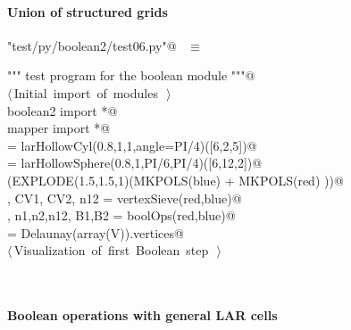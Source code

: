 \documentclass[11pt,oneside]{article}	%
\begin{document}
\paragraph{Union of structured grids}

\begin{flushleft} \small
\begin{minipage}{\linewidth} \label{scrap36}
\verb@"test/py/boolean2/test06.py"@\nobreak\ {\footnotesize {} }$\equiv$
\vspace{-1ex}
\begin{list}{}{} \item
\mbox{}\verb@""" test program for the boolean module """@\\
\mbox{}\verb@@\hbox{$\langle\,$Initial import of modules\nobreak\ {\footnotesize {}}$\,\rangle$}\verb@@\\
\mbox{}\verb@from boolean2 import *@\\
\mbox{}\verb@from mapper import *@\\
\mbox{}\verb@blue = larHollowCyl(0.8,1,1,angle=PI/4)([6,2,5])@\\
\mbox{}\verb@red = larHollowSphere(0.8,1,PI/6,PI/4)([6,12,2])@\\
\mbox{}\verb@VIEW(EXPLODE(1.5,1.5,1)(MKPOLS(blue) + MKPOLS(red) ))@\\
\mbox{}\verb@V, CV1, CV2, n12 = vertexSieve(red,blue)@\\
\mbox{}\verb@V, n1,n2,n12, B1,B2 = boolOps(red,blue)@\\
\mbox{}\verb@CV = Delaunay(array(V)).vertices@\\
\mbox{}\verb@@\hbox{$\langle\,$Visualization of first Boolean step\nobreak\ {\footnotesize {}}$\,\rangle$}\verb@@\\
\mbox{}\verb@@{\NWsep}
\end{list}
\vspace{-2ex}
\end{minipage}\\[4ex]
\end{flushleft}





\paragraph{Boolean operations with general LAR cells}
\end{document}
